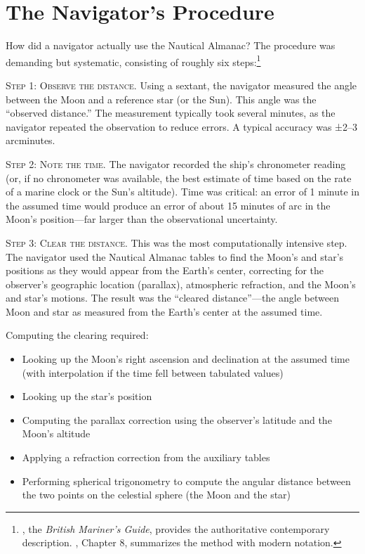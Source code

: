 \section{The Navigator's Procedure}

How did a navigator actually use the Nautical Almanac? The procedure was demanding but systematic, consisting of roughly six steps:\footnote{\textcite{Maskelyne1763}, the \emph{British Mariner's Guide}, provides the authoritative contemporary description. \textcite{Howse1980}, Chapter 8, summarizes the method with modern notation.}

\textsc{Step 1: Observe the distance.} Using a sextant, the navigator measured the angle between the Moon and a reference star (or the Sun). This angle was the ``observed distance.'' The measurement typically took several minutes, as the navigator repeated the observation to reduce errors. A typical accuracy was ±2--3 arcminutes.

\textsc{Step 2: Note the time.} The navigator recorded the ship's chronometer reading (or, if no chronometer was available, the best estimate of time based on the rate of a marine clock or the Sun's altitude). Time was critical: an error of 1 minute in the assumed time would produce an error of about 15 minutes of arc in the Moon's position—far larger than the observational uncertainty.

\textsc{Step 3: Clear the distance.} This was the most computationally intensive step. The navigator used the Nautical Almanac tables to find the Moon's and star's positions as they would appear from the Earth's center, correcting for the observer's geographic location (parallax), atmospheric refraction, and the Moon's and star's motions. The result was the ``cleared distance''—the angle between Moon and star as measured from the Earth's center at the assumed time.

Computing the clearing required:
\begin{itemize}
\item Looking up the Moon's right ascension and declination at the assumed time (with interpolation if the time fell between tabulated values)
\item Looking up the star's position
\item Computing the parallax correction using the observer's latitude and the Moon's altitude
\item Applying a refraction correction from the auxiliary tables
\item Performing spherical trigonometry to compute the angular distance between the two points on the celestial sphere (the Moon and the star)
\end{itemize}

